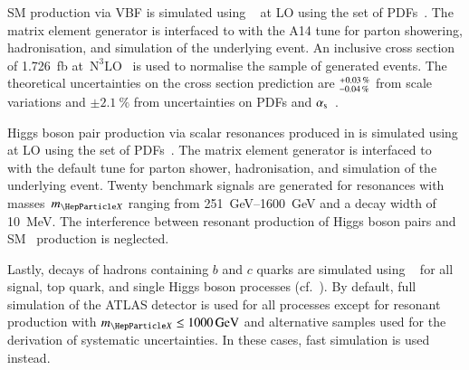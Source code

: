 SM \HH production via VBF is simulated using
\MGNLO~\cite{Alwall:2014hca} %
at LO %
using the \NNPDF[3.0nlo] set of PDFs~\cite{Ball:2014uwa}. The matrix element
generator is interfaced to \PYTHIA[8] with the A14 tune for parton showering,
hadronisation, and simulation of the underlying event. An inclusive cross
section of \SI{1.726}{\femto\barn}
at~$\text{N}^3\text{LO}$~\cite{Dreyer:2018qbw,LHCHWGHH} is used to normalise the
sample of generated events. The theoretical uncertainties on the cross section
prediction are $^{\hspace{0.25pt}+\hspace{0.25pt}0.03\,\%}_{-0.04\,\%}$ from
scale variations and $\pm\SI{2.1}{\percent}$ from uncertainties on PDFs and
$\alpha_{\text{s}}$~\cite{LHCHWGHH}.

Higgs boson pair production via scalar resonances produced in \ggF is simulated
using \MGNLO at LO using the \NNPDF[2.3lo] set of PDFs~\cite{Ball:2012cx}. The
matrix element generator is interfaced to
\HERWIG[7.1]~\cite{Gieseke:2012ft,Bellm:2017jjp} with the default tune for
parton shower, hadronisation, and simulation of the underlying event. Twenty
benchmark signals are generated for resonances with masses~$\mX$ ranging from
\SIrange{251}{1600}{\GeV} and a decay width of \SI{10}{\MeV}.
The interference between resonant production of Higgs boson pairs and SM~\HH
production is neglected.

Lastly, decays of hadrons containing $b$ and $c$ quarks are simulated using
\EVTGEN~\cite{Lange:2001uf} for all signal, top quark, and single Higgs boson
processes (cf.~). By default, full simulation of the ATLAS
detector is used for all processes except for resonant \HH production with
$\mX \leq \SI{1000}{\GeV}$ and alternative samples used for the derivation of
systematic uncertainties. In these cases, fast simulation is used instead.

